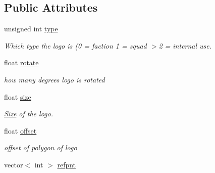 \subsection*{Public Attributes}
\begin{DoxyCompactItemize}
\item 
unsigned int \hyperlink{structMeshXML_1_1ZeLogo_afa03c4afc52d3d5c339b55ffe787ea97}{type}\hypertarget{structMeshXML_1_1ZeLogo_afa03c4afc52d3d5c339b55ffe787ea97}{}\label{structMeshXML_1_1ZeLogo_afa03c4afc52d3d5c339b55ffe787ea97}

\begin{DoxyCompactList}\small\item\em Which type the logo is (0 = faction 1 = squad $>$2 = internal use. \end{DoxyCompactList}\item 
float \hyperlink{structMeshXML_1_1ZeLogo_a3a36206843df14520d907e0e5c1c044e}{rotate}\hypertarget{structMeshXML_1_1ZeLogo_a3a36206843df14520d907e0e5c1c044e}{}\label{structMeshXML_1_1ZeLogo_a3a36206843df14520d907e0e5c1c044e}

\begin{DoxyCompactList}\small\item\em how many degrees logo is rotated \end{DoxyCompactList}\item 
float \hyperlink{structMeshXML_1_1ZeLogo_ae1a09b7de702779ecc11a9e7d17a960e}{size}\hypertarget{structMeshXML_1_1ZeLogo_ae1a09b7de702779ecc11a9e7d17a960e}{}\label{structMeshXML_1_1ZeLogo_ae1a09b7de702779ecc11a9e7d17a960e}

\begin{DoxyCompactList}\small\item\em \hyperlink{structSize}{Size} of the logo. \end{DoxyCompactList}\item 
float \hyperlink{structMeshXML_1_1ZeLogo_a7db500bafa9f2596fddc4a5e4584ead5}{offset}\hypertarget{structMeshXML_1_1ZeLogo_a7db500bafa9f2596fddc4a5e4584ead5}{}\label{structMeshXML_1_1ZeLogo_a7db500bafa9f2596fddc4a5e4584ead5}

\begin{DoxyCompactList}\small\item\em offset of polygon of logo \end{DoxyCompactList}\item 
vector$<$ int $>$ \hyperlink{structMeshXML_1_1ZeLogo_a1d3cac8d9825f101511a20e70c0812ca}{refpnt}\hypertarget{structMeshXML_1_1ZeLogo_a1d3cac8d9825f101511a20e70c0812ca}{}\label{structMeshXML_1_1ZeLogo_a1d3cac8d9825f101511a20e70c0812ca}


\end{DoxyCompactItemize}
